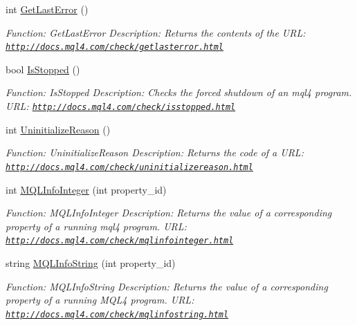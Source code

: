 \begin{DoxyCompactItemize}
int \hyperlink{class_m_q_l4_c_sharp_1_1_base_1_1_m_q_l_base_a28b16c654dd694b61c92aed59f7bbcec}{Get\+Last\+Error} ()
\begin{DoxyCompactList}\small\item\em Function\+: Get\+Last\+Error Description\+: Returns the contents of the U\+RL\+: \href{http://docs.mql4.com/check/getlasterror.html}{\tt http\+://docs.\+mql4.\+com/check/getlasterror.\+html} \end{DoxyCompactList}\item 
bool \hyperlink{class_m_q_l4_c_sharp_1_1_base_1_1_m_q_l_base_a39c04441e3371592a89034ae20455e6d}{Is\+Stopped} ()
\begin{DoxyCompactList}\small\item\em Function\+: Is\+Stopped Description\+: Checks the forced shutdown of an mql4 program. U\+RL\+: \href{http://docs.mql4.com/check/isstopped.html}{\tt http\+://docs.\+mql4.\+com/check/isstopped.\+html} \end{DoxyCompactList}\item 
int \hyperlink{class_m_q_l4_c_sharp_1_1_base_1_1_m_q_l_base_ae8f3df180c1b8fc9d3fd0521297a6195}{Uninitialize\+Reason} ()
\begin{DoxyCompactList}\small\item\em Function\+: Uninitialize\+Reason Description\+: Returns the code of a U\+RL\+: \href{http://docs.mql4.com/check/uninitializereason.html}{\tt http\+://docs.\+mql4.\+com/check/uninitializereason.\+html} \end{DoxyCompactList}\item 
int \hyperlink{class_m_q_l4_c_sharp_1_1_base_1_1_m_q_l_base_aad7849476779788c33ad88807b65a38a}{M\+Q\+L\+Info\+Integer} (int property\+\_\+id)
\begin{DoxyCompactList}\small\item\em Function\+: M\+Q\+L\+Info\+Integer Description\+: Returns the value of a corresponding property of a running mql4 program. U\+RL\+: \href{http://docs.mql4.com/check/mqlinfointeger.html}{\tt http\+://docs.\+mql4.\+com/check/mqlinfointeger.\+html} \end{DoxyCompactList}\item 
string \hyperlink{class_m_q_l4_c_sharp_1_1_base_1_1_m_q_l_base_afd155b5fae16e73f6ed9b6a229296bbe}{M\+Q\+L\+Info\+String} (int property\+\_\+id)
\begin{DoxyCompactList}\small\item\em Function\+: M\+Q\+L\+Info\+String Description\+: Returns the value of a corresponding property of a running M\+Q\+L4 program. U\+RL\+: \href{http://docs.mql4.com/check/mqlinfostring.html}{\tt http\+://docs.\+mql4.\+com/check/mqlinfostring.\+html} \end{DoxyCompactList}\item 

\end{DoxyCompactItemize}
